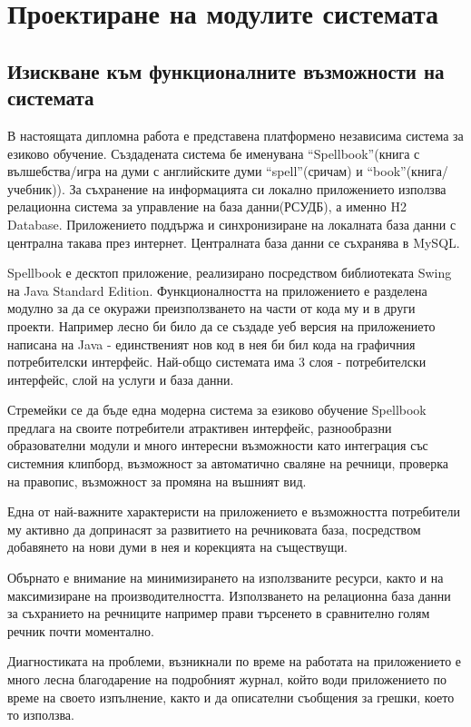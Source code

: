 \chapter{Проектиране на модулите системата}
\section{Изискване към функционалните възможности на системата}
В настоящата дипломна работа е представена платформено независима
система за езиково обучение. Създадената система бе именувана
"`Spellbook"'(книга с вълшебства/игра на думи с английските думи
"`spell"'(сричам) и "`book"'(книга/учебник)). За съхранение на
информацията си локално приложението използва релационна система за
управление на база данни(РСУДБ), а именно H2 Database. Приложението
поддържа и синхронизиране на локалната база данни с централна такава
през интернет. Централната база данни се съхранява в MySQL.

Spellbook е десктоп приложение, реализирано посредством библиотеката
Swing на Java Standard Edition. Функционалността на приложението е
разделена модулно за да се окуражи преизползването на части от кода му
и в други проекти. Например лесно би било да се създаде уеб версия на
приложението написана на Java - единственият нов код в нея би бил кода
на графичния потребителски интерфейс. Най-общо системата има 3 слоя - потребителски
интерфейс, слой на услуги и база данни.

Стремейки се да бъде една модерна система за езиково обучение
Spellbook предлага на своите потребители атрактивен интерфейс,
разнообразни образователни модули и много интересни възможности като
интеграция със системния клипборд, възможност за автоматично сваляне
на речници, проверка на правопис, възможност за промяна на въшният
вид. 

Една от най-важните характеристи на приложението е възможността
потребители му активно да допринасят за развитието на речниковата
база, посредством добавянето на нови думи в нея и корекцията на
съществущи. 

Обърнато е внимание на минимизирането на използваните ресурси, както и
на максимизиране на производителността. Използването на релационна
база данни за съхранието на речниците например прави търсенето в
сравнително голям речник почти моментално. 

Диагностиката на проблеми, възникнали по време на работата на
приложението е много лесна благодарение на подробният журнал, който
води приложението по време на своето изпълнение, както и да описателни
съобщения за грешки, което то използва. 

